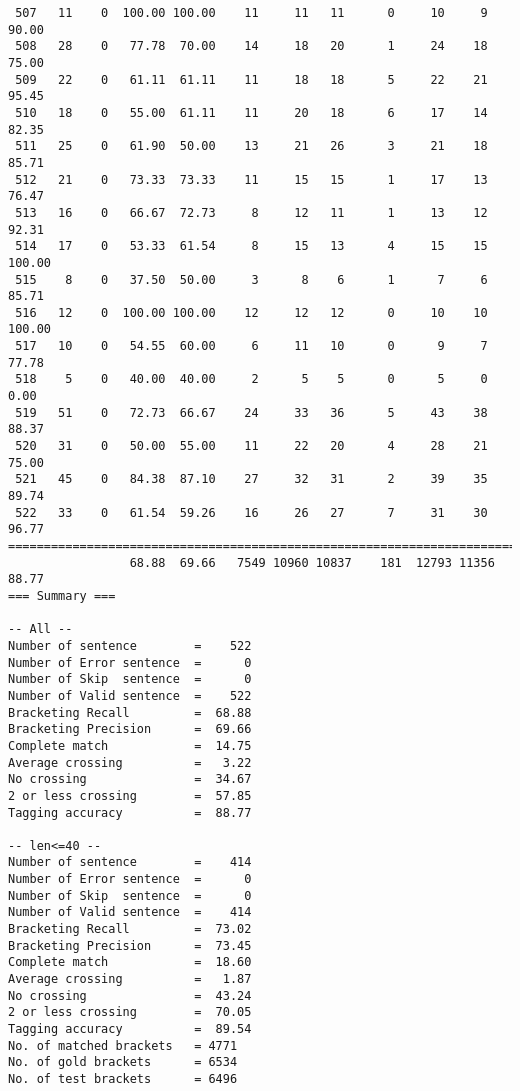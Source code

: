 \begin{verbatim}
 507   11    0  100.00 100.00    11     11   11      0     10     9    90.00
 508   28    0   77.78  70.00    14     18   20      1     24    18    75.00
 509   22    0   61.11  61.11    11     18   18      5     22    21    95.45
 510   18    0   55.00  61.11    11     20   18      6     17    14    82.35
 511   25    0   61.90  50.00    13     21   26      3     21    18    85.71
 512   21    0   73.33  73.33    11     15   15      1     17    13    76.47
 513   16    0   66.67  72.73     8     12   11      1     13    12    92.31
 514   17    0   53.33  61.54     8     15   13      4     15    15   100.00
 515    8    0   37.50  50.00     3      8    6      1      7     6    85.71
 516   12    0  100.00 100.00    12     12   12      0     10    10   100.00
 517   10    0   54.55  60.00     6     11   10      0      9     7    77.78
 518    5    0   40.00  40.00     2      5    5      0      5     0     0.00
 519   51    0   72.73  66.67    24     33   36      5     43    38    88.37
 520   31    0   50.00  55.00    11     22   20      4     28    21    75.00
 521   45    0   84.38  87.10    27     32   31      2     39    35    89.74
 522   33    0   61.54  59.26    16     26   27      7     31    30    96.77
============================================================================
                 68.88  69.66   7549 10960 10837    181  12793 11356    88.77
=== Summary ===

-- All --
Number of sentence        =    522
Number of Error sentence  =      0
Number of Skip  sentence  =      0
Number of Valid sentence  =    522
Bracketing Recall         =  68.88
Bracketing Precision      =  69.66
Complete match            =  14.75
Average crossing          =   3.22
No crossing               =  34.67
2 or less crossing        =  57.85
Tagging accuracy          =  88.77

-- len<=40 --
Number of sentence        =    414
Number of Error sentence  =      0
Number of Skip  sentence  =      0
Number of Valid sentence  =    414
Bracketing Recall         =  73.02
Bracketing Precision      =  73.45
Complete match            =  18.60
Average crossing          =   1.87
No crossing               =  43.24
2 or less crossing        =  70.05
Tagging accuracy          =  89.54
No. of matched brackets   = 4771
No. of gold brackets      = 6534
No. of test brackets      = 6496

\end{verbatim}

\normalsize

